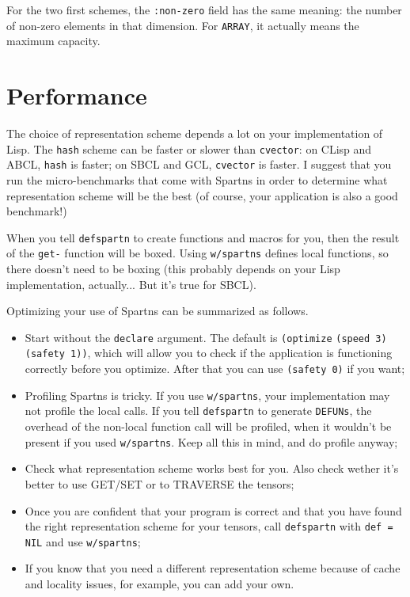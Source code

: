 \documentclass{article}
\begin{document}
For the two first schemes, the \verb+:non-zero+ field has the same meaning: the number of non-zero elements in
that dimension. For \verb+ARRAY+, it actually means the maximum capacity.

\section{Performance}

The choice of representation scheme depends a lot on your implementation of Lisp.
The \verb+hash+ scheme can be faster or slower than \verb+cvector+: on CLisp and
ABCL, \verb+hash+ is faster; on SBCL and GCL, \verb+cvector+ is faster.
I suggest that you run the micro-benchmarks that come with Spartns in order to determine
what representation scheme will be the best (of course, your application is also a
good benchmark!)

When you tell \verb+defspartn+ to create functions and macros for you, then the result of
the \verb+get-+ function will be boxed. Using \verb+w/spartns+ defines local functions, so
there doesn't need to be boxing (this probably depends on your Lisp implementation,
actually... But it's true for SBCL).

Optimizing your use of Spartns can be summarized as follows.

\begin{itemize}
\item Start without the \verb+declare+ argument. The default is
      \verb+(optimize+ \verb+(speed 3)+ \verb+(safety 1))+, which will allow you to check
      if the application is functioning correctly before you optimize. After that
      you can use \verb+(safety 0)+ if you want;
\item Profiling Spartns is tricky. If you use \verb+w/spartns+, your implementation
      may not profile the local calls. If you tell \verb+defspartn+ to generate
      \verb+DEFUNs+, the overhead of the non-local function call will be profiled, when
      it wouldn't be present if you used \verb+w/spartns+. Keep all this in mind,
      and do profile anyway;
\item Check what representation scheme works best for you. Also check wether it's
      better to use GET/SET or to TRAVERSE the tensors;
\item Once you are confident that your program is correct and that you have found the
      right representation scheme for your tensors, call \verb+defspartn+ with
      \verb+def = NIL+ and use \verb+w/spartns+;
\item If you know that you need a different representation scheme because of cache and
      locality issues, for example, you can add your own.
\end{itemize}
\end{document}
